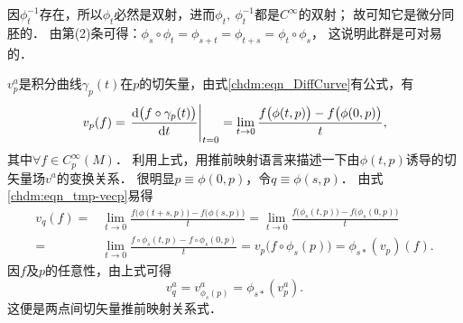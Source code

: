 因$\phi_t^{-1}$存在，所以$\phi_t$必然是双射，进而$\phi_t, \ \phi_t^{-1}$都是$C^\infty$的双射；
故可知它是{\heiti 微分同胚}的．
由第(2)条可得：$\phi_s\circ \phi_t = \phi_{s+t}= \phi_{t+s}=\phi_t\circ \phi_s$，
这说明此群是可对易的．




$v^a_p$是积分曲线$\gamma_p(t)$在$p$的切矢量，由式\eqref{chdm:eqn_DiffCurve}有公式，有
\begin{equation}\label{chdm:eqn_tmp-vecp}
    v_p(f)= \left. \frac{{\rm d} \bigl(f \circ \gamma_p (t)\bigr)}{{\rm d} t} \right |_{t=0}
    = \lim_{t\to 0} \frac{f\bigl(\phi(t,p)\bigr) - f\bigl(\phi(0,p)\bigr)}{t},
\end{equation}
其中$\forall f\in C^\infty _p(M) $．
利用上式，用推前映射语言来描述一下由$\phi(t,p)$诱导的切矢量场$v^a$的变换关系．
    很明显$p\equiv\phi(0,p)$，令$q\equiv\phi(s,p)$．
    由式\eqref{chdm:eqn_tmp-vecp}易得
    \begin{align*}
        v_q(f)=& \lim_{t\to 0} \frac{f\bigl(\phi(t+s,p)\bigr) - f\bigl(\phi(s,p)\bigr)}{t}
         =\lim_{t\to 0} \frac{f\bigl(\phi_s(t,p)\bigr) - f\bigl(\phi_s(0,p)\bigr)}{t} \\
         =&\lim_{t\to 0} \frac{f\circ \phi_s(t,p) - f\circ \phi_s(0,p)}{t}
         =v_p\bigl(f\circ \phi_s(p) \bigr)  =\phi_{s*}(v_p)(f).
    \end{align*}
    因$f$及$p$的任意性，由上式可得
    \begin{equation}\label{chdm:eqn_phisv}
        v^a_q = v^a_{\phi_s(p)} = \phi_{s*}(v^a_p) .
    \end{equation}
    这便是两点间切矢量推前映射关系式．


